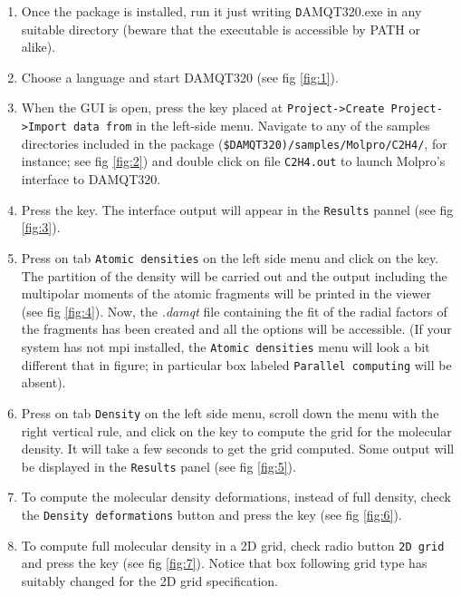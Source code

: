 \documentclass[a4paper,10pt]{article}
\begin{document}
\begin{enumerate}

\item Once the package is installed, run it just writing {\texttt DAMQT320.exe} in any
suitable directory (beware that the executable is accessible by PATH or alike).

\item Choose a language and start DAMQT320 (see fig \ref{fig:1}).

\item When the GUI is open, press the \teclapuntos key placed at
\texttt{Project->Create Project->Import data from} in the left-side menu. Navigate to any
of the samples directories included in the package 
(\texttt{\$DAMQT320)/samples/Molpro/C2H4/}, for
instance; see fig \ref{fig:2}) and double click on file \texttt{C2H4.out}
to launch Molpro's interface to DAMQT320.

\item Press the \exec key. The interface output will appear in the \texttt{Results} pannel 
(see fig \ref{fig:3}).

\item Press on tab \texttt{Atomic densities} on the left side menu and click on
the \exec key. The partition of the density will be carried out and the output
including the multipolar moments of the atomic fragments will be printed in the
viewer (see fig \ref{fig:4}). Now, the {\it .damqt} file containing the fit of the
radial factors of the fragments has been created and all the options will be
accessible. (If your system has not mpi installed, the \texttt{Atomic densities}
menu will look a bit different that in figure; in particular
box labeled \texttt{Parallel computing} will be absent).

\item Press on tab \texttt{Density} on the left side menu, scroll down the menu
with the right vertical rule, and click on
the \exec key to compute the grid for the molecular density. It will take a
few seconds to get the grid computed. Some output will be displayed in the \texttt{Results}
panel (see fig \ref{fig:5}).

\item To compute the molecular density deformations, instead of full density,
check the \texttt{Density deformations} button and press
the \exec key  (see fig \ref{fig:6}).

\item To compute full molecular density in a 2D grid, check radio button
\texttt{2D grid} and press the \exec key  (see fig \ref{fig:7}).
Notice that box following grid type has suitably changed for the 2D grid 
specification.


\end{enumerate}
\end{document}

